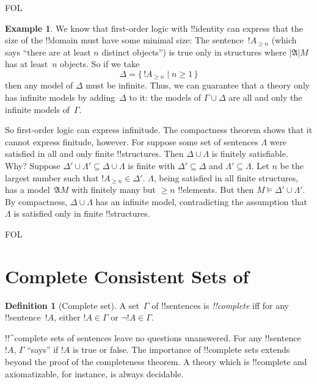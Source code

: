 \documentclass[10pt,a4paper]{article}
\theoremstyle{plain}
\theoremstyle{definition}
\newtheorem{defn}[thm]{Definition}
\newtheorem{ex}[thm]{Example}
\theoremstyle{remark}
\newenvironment{explain}{}{}
\newcommand*{\olfileid}[3]{}
\newcommand*{\olsection}[1]{\section*{#1}}
\newcommand*{\ollabel}[1]{\label{#1}}
\providecommand{\Struct}{\ensuremath{\mathfrak{A}}}
\providecommand{\Domain}{\ensuremath{|\mathfrak{A}|}}
\providecommand{\Sat}[2]{\ensuremath{#1 \models #2}}
\providecommand{\iftag}[1]{#1}
\providecommand{\Setabs}[2]{\{\, #1 \mid #2 \,\}}
\begin{document}
\iftag{FOL}{
\begin{ex}
We know that first-order logic with !!{identity} can express that the
size of the !!{domain} must have some minimal size: The
sentence~$!A_{\ge n}$ (which says ``there are at least $n$ distinct
objects'') is true only in structures where $\Domain{M}$ has at
least~$n$ objects. So if we take
  \[
  \Delta = \Setabs{!A_{\ge n}}{n \ge 1}
  \]
then any model of $\Delta$ must be infinite. Thus, we can guarantee
that a theory only has infinite models by adding~$\Delta$ to it: the
models of $\Gamma \cup \Delta$ are all and only the infinite models
of~$\Gamma$.

So first-order logic can express infinitude. The compactness theorem
shows that it cannot express finitude, however. For suppose some set
of sentences $\Lambda$ were satisfied in all and only finite
!!{structure}s. Then $\Delta \cup \Lambda$ is finitely
satisfiable. Why? Suppose $\Delta' \cup \Lambda' \subseteq \Delta \cup
\Lambda$ is finite with $\Delta' \subseteq \Delta$ and $\Lambda'
\subseteq \Lambda$. Let $n$ be the largest number such that $!A_{\ge n}
\in \Delta'$. $\Lambda$, being satisfied in all finite structures, has
a model~$\Struct{M}$ with finitely many but $\ge n$ !!{element}s. But
then $\Sat{M}{\Delta' \cup \Lambda'}$.  By compactness, $\Delta \cup
\Lambda$ has an infinite model, contradicting the assumption that
$\Lambda$ is satisfied only in finite !!{structure}s.
\end{ex}
}{}






\iftag{FOL}
      {\olfileid{fol}{com}{ccs}}
      {\olfileid{pl}{com}{ccs}}
      
\olsection{Complete Consistent Sets of }

\begin{defn}[Complete set]
\ollabel{def:complete-set} A set~$\Gamma$ of !!{sentence}s is
\emph{!!{complete}} iff for any !!{sentence}~$!A$, either $!A \in
\Gamma$ or $\lnot !A \in \Gamma$.
\end{defn}

\begin{explain}
!!^{complete} sets of sentences leave no questions unanswered. For
any !!{sentence}~$!A$, $\Gamma$ ``says'' if $!A$ is true or false.  The
importance of !!{complete} sets extends beyond the proof of the
completeness theorem. A theory which is !!{complete} and
axiomatizable, for instance, is always decidable.
\end{explain}
\end{document}
